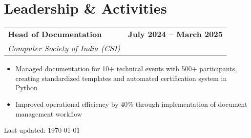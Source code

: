 \documentclass[10pt,a4paper]{article}
\makeatletter
\newcommand{\resumeItem}[1]{\item\small{#1}}
\newcommand{\resumeSubheading}[4]{
  \vspace{-1pt}
  \begin{tabular*}{\textwidth}[t]{l@{\extracolsep{\fill}}r}
    \textbf{#1} & \textcolor{light}{\small\textbf{#2}} \\
    \textit{\small#3} & \textcolor{light}{\small#4} \\
  \end{tabular*}\vspace{-5pt}
}
\makeatother
\begin{document}
\section{Leadership \& Activities}

\resumeSubheading
{Head of Documentation}{July 2024 -- March 2025}
{Computer Society of India (CSI)}{}
\begin{itemize}
    \resumeItem{Managed documentation for 10+ technical events with 500+ participants, creating standardized templates and automated certification system in Python}
    \resumeItem{Improved operational efficiency by 40\% through implementation of document management workflow}
\end{itemize}

\vfill
\begin{center}
    \textcolor{light}{\footnotesize Last updated: \today}
\end{center}
\end{document}
